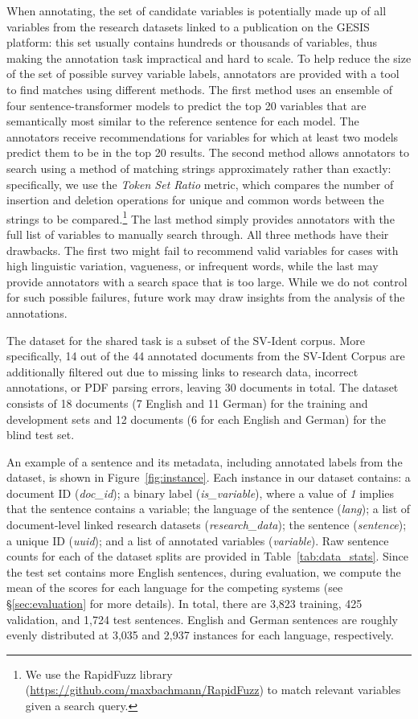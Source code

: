 \documentclass[11pt]{article}
\begin{document}
When annotating, the set of candidate variables is potentially made up of all variables from the research datasets linked to a publication on the GESIS platform: this set usually contains hundreds or thousands of variables, thus making the annotation task impractical and hard to scale.
To help reduce the size of the set of possible survey variable labels, annotators are provided with a tool to find matches using different methods.
The first method uses an ensemble of four sentence-transformer models to predict the top 20 variables that are semantically most similar to the reference sentence for each model.
The annotators receive recommendations for variables for which at least two models predict them to be in the top 20 results.
The second method allows annotators to search using a method of matching strings approximately rather than exactly: specifically, we use the \textit{Token Set Ratio} metric, which compares the number of insertion and deletion operations for unique and common words between the strings to be compared.\footnote{We use the RapidFuzz library (\url{https://github.com/maxbachmann/RapidFuzz}) to match relevant variables given a search query.}
The last method simply provides annotators with the full list of variables to manually search through.
All three methods have their drawbacks.
The first two might fail to recommend valid variables for cases with high linguistic variation, vagueness, or infrequent words, while the last may provide annotators with a search space that is too large.
While we do not control for such possible failures, future work may draw insights from the analysis of the annotations.

The dataset for the shared task is a subset of the SV-Ident corpus.
More specifically, 14 out of the 44 annotated documents from the SV-Ident Corpus are additionally filtered out due to missing links to research data, incorrect annotations, or PDF parsing errors, leaving 30 documents in total.
The dataset consists of 18 documents (7 English and 11 German) for the training and development sets and 12 documents (6 for each English and German) for the blind test set.

An example of a sentence and its metadata, including annotated labels from the dataset, is shown in Figure~\ref{fig:instance}.
Each instance in our dataset contains: a document ID (\textit{doc\_id}); a binary label (\textit{is\_variable}), where a value of \textit{1} implies that the sentence contains a variable; the language of the sentence (\textit{lang}); a list of document-level linked research datasets (\textit{research\_data}); the sentence (\textit{sentence}); a unique ID (\textit{uuid}); and a list of annotated variables (\textit{variable}).
Raw sentence counts for each of the dataset splits are provided in Table~\ref{tab:data_stats}.
Since the test set contains more English sentences, during evaluation, we compute the mean of the scores for each language for the competing systems (see \S\ref{sec:evaluation} for more details).
In total, there are 3,823 training, 425 validation, and 1,724 test sentences.
English and German sentences are roughly evenly distributed at 3,035 and 2,937 instances for each language, respectively.
\end{document}
